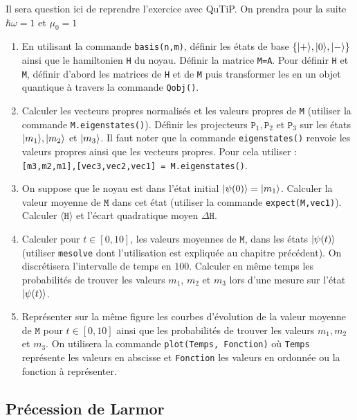 Il sera question ici de reprendre l'exercice avec QuTiP. On prendra pour la suite $\hbar\omega=1$ et $\mu_0=1$
\begin{enumerate}
\item En utilisant la commande \texttt{basis(n,m)}, définir les états de base $\{\vert+\rangle,\vert0\rangle,\vert-\rangle\}$ ainsi que le hamiltonien \texttt{H} du noyau. Définir la matrice \texttt{M=A}. Pour définir \texttt{H} et \texttt{M}, définir d'abord les matrices de \texttt{H} et de \texttt{M} puis transformer les en un objet quantique à travers la commande \texttt{Qobj()}.

\item Calculer les vecteurs propres normalisés et les valeurs propres de \texttt{M} (utiliser la commande \texttt{M.eigenstates()}). Définir les projecteurs $\mathtt{P}_1,\mathtt{P}_2$ et $\mathtt{P}_3$ sur les états $\vert m_1\rangle,\vert m_2\rangle$ et $\vert m_3\rangle$. Il faut noter que la commande \texttt{eigenstates()} renvoie les valeurs propres ainsi que les vecteurs propres. Pour cela utiliser :\\
\texttt{[m3,m2,m1],[vec3,vec2,vec1] = M.eigenstates()}.

\item On suppose que le noyau est dans l'état initial $\vert\psi(0)\rangle=\vert m_1\rangle$. Calculer la valeur moyenne de $\mathtt{M}$ dans cet état (utiliser la commande \texttt{expect(M,vec1)}). Calculer $\langle \mathtt{H}\rangle$ et l'écart quadratique moyen $\Delta \mathtt{H}$.

\item Calculer pour $t\in[0,10]$, les valeurs moyennes de $\mathtt{M}$, dans les états $\vert\psi(t)\rangle$ (utiliser \texttt{mesolve} dont l'utilisation est expliquée au chapitre précédent). On discrétisera l'intervalle de temps en $100$. Calculer en même temps les probabilités de trouver les valeurs $m_1$, $m_2$ et $m_3$ lors d'une mesure sur l'état $\vert\psi(t)\rangle$.

\item Représenter sur la même figure les courbes d'évolution de la valeur moyenne de $\mathtt{M}$ pour $t\in[0,10]$ ainsi que les probabilités de trouver les valeurs $m_1,m_2$ et $m_3$. On utilisera la commande \texttt{plot(Temps, Fonction)} où \texttt{Temps} représente les valeurs en abscisse et \texttt{Fonction} les valeurs en ordonnée ou la fonction à représenter.
\end{enumerate}

\subsection{Précession de Larmor}


